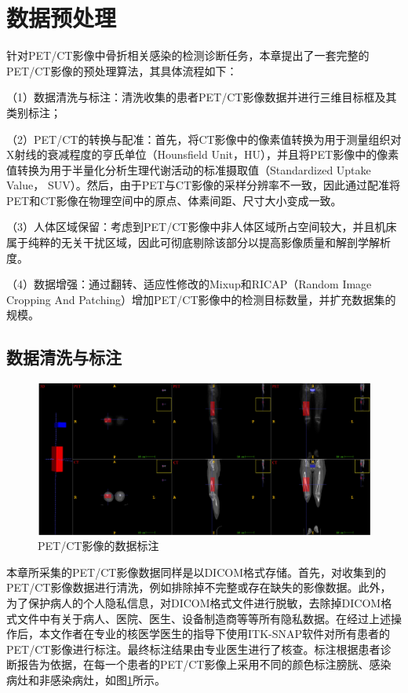 \section{数据预处理}

针对PET/CT影像中骨折相关感染的检测诊断任务，本章提出了一套完整的PET/CT影像的预处理算法，其具体流程如下：

（1）数据清洗与标注：清洗收集的患者PET/CT影像数据并进行三维目标框及其类别标注；

（2）PET/CT的转换与配准：首先，将CT影像中的像素值转换为用于测量组织对X射线的衰减程度的亨氏单位（Hounsfield Unit，HU），并且将PET影像中的像素值转换为用于半量化分析生理代谢活动的标准摄取值（Standardized Uptake Value， SUV）。然后，由于PET与CT影像的采样分辨率不一致，因此通过配准将PET和CT影像在物理空间中的原点、体素间距、尺寸大小变成一致。

（3）人体区域保留：考虑到PET/CT影像中非人体区域所占空间较大，并且机床属于纯粹的无关干扰区域，因此可彻底剔除该部分以提高影像质量和解剖学解析度。

（4）数据增强：通过翻转、适应性修改的Mixup和RICAP（Random Image Cropping And Patching）增加PET/CT影像中的检测目标数量，并扩充数据集的规模。

\subsection{数据清洗与标注}

\begin{figure}[htbp]
  \centering
  \includegraphics[width=\textwidth]{figures/chap04_label.jpg}
  \caption{PET/CT影像的数据标注}
  \label{fig:chap04_label}
\end{figure}

本章所采集的PET/CT影像数据同样是以DICOM格式存储。首先，对收集到的PET/CT影像数据进行清洗，例如排除掉不完整或存在缺失的影像数据。此外，为了保护病人的个人隐私信息，对DICOM格式文件进行脱敏，去除掉DICOM格式文件中有关于病人、医院、医生、设备制造商等等所有隐私数据。在经过上述操作后，本文作者在专业的核医学医生的指导下使用ITK-SNAP软件对所有患者的PET/CT影像进行标注。最终标注结果由专业医生进行了核查。标注根据患者诊断报告为依据，在每一个患者的PET/CT影像上采用不同的颜色标注膀胱、感染病灶和非感染病灶，如图\ref{fig:chap04_label}所示。

